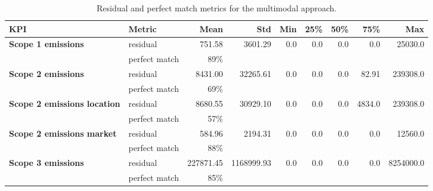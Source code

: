 \documentclass[english, 12pt, a4paper, elec, utf8, a-2b, online]{aaltothesis}
\newcommand{\ra}[1]{\renewcommand{\arraystretch}{#1}}
\begin{document}
\begin{table}\centering
    \ra{1.3}
    \begin{tabular}{@{}llrrrrrrr@{}}\toprule
        \textbf{KPI} & \textbf{Metric} & \textbf{Mean} & \textbf{Std} & \textbf{Min} & \textbf{25\%} & \textbf{50\%} & \textbf{75\%} & \textbf{Max} \\ \midrule
        \textbf{Scope 1 emissions} & residual & 751.58 & 3601.29 & 0.0 & 0.0 & 0.0 & 0.0 & 25030.0 \\
        & perfect match & 89\% & & & & & & \\
        \textbf{Scope 2 emissions} & residual & 8431.00 & 32265.61 & 0.0 & 0.0 & 0.0 & 82.91 & 239308.0 \\
        & perfect match & 69\% & & & & & & \\
        \textbf{Scope 2 emissions location} & residual & 8680.55 & 30929.10 & 0.0 & 0.0 & 0.0 & 4834.0 & 239308.0 \\
        & perfect match & 57\% & & & & & & \\
        \textbf{Scope 2 emissions market} & residual & 584.96 & 2194.31 & 0.0 & 0.0 & 0.0 & 0.0 & 12560.0 \\
        & perfect match & 88\% & & & & & & \\
        \textbf{Scope 3 emissions} & residual & 227871.45 & 1168999.93 & 0.0 & 0.0 & 0.0 & 0.0 & 8254000.0 \\
        & perfect match & 85\% & & & & & & \\
        \bottomrule
    \end{tabular}
    \caption{Residual and perfect match metrics for the multimodal approach.}
    \label{tab:multimodal_metrics}
\end{table}

\end{document}
